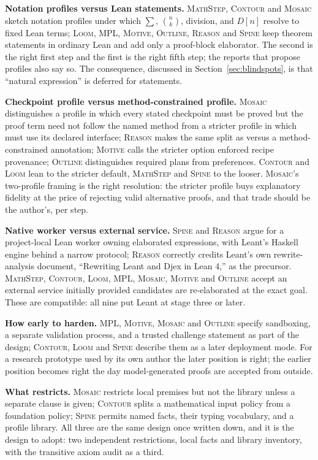 \documentclass[11pt,a4paper]{article}
\newcommand{\code}[1]{\texttt{\detokenize{#1}}}
\newcommand{\MS}{\textsc{MathStep}}
\newcommand{\Co}{\textsc{Contour}}
\newcommand{\Lo}{\textsc{Loom}}
\newcommand{\ML}{\textsc{MPL}}
\newcommand{\Mo}{\textsc{Mosaic}}
\newcommand{\Mv}{\textsc{Motive}}
\newcommand{\Ou}{\textsc{Outline}}
\renewcommand{\Re}{\textsc{Reason}} %
\newcommand{\Sp}{\textsc{Spine}}
\theoremstyle{definition}
\begin{document}
\textbf{Notation profiles versus Lean statements.} \MS, \Co{} and \Mo{} sketch notation profiles under which $\sum$, $\binom{n}{k}$, division, and $D[n]$ resolve to fixed Lean terms; \Lo, \ML, \Mv, \Ou, \Re{} and \Sp{} keep theorem statements in ordinary Lean and add only a proof-block elaborator. The second is the right first step and the first is the right fifth step; the reports that propose profiles also say so. The consequence, discussed in Section~\ref{sec:blindspots}, is that ``natural expression'' is deferred for statements.

\textbf{Checkpoint profile versus method-constrained profile.} \Mo{} distinguishes a profile in which every stated checkpoint must be proved but the proof term need not follow the named method from a stricter profile in which \code{integrate} must use its declared interface; \Re{} makes the same split as \code{by auto} versus a method-constrained annotation; \Mv{} calls the stricter option enforced recipe provenance; \Ou{} distinguishes required plans from preferences. \Co{} and \Lo{} lean to the stricter default, \MS{} and \Sp{} to the looser. \Mo's two-profile framing is the right resolution: the stricter profile buys explanatory fidelity at the price of rejecting valid alternative proofs, and that trade should be the author's, per step.

\textbf{Native worker versus external service.} \Sp{} and \Re{} argue for a project-local Lean worker owning elaborated expressions, with Leant's Haskell engine behind a narrow protocol; \Re{} correctly credits Leant's own rewrite-analysis document, ``Rewriting Leant and Djex in Lean 4,'' as the precursor. \MS, \Co, \Lo, \ML, \Mo, \Mv{} and \Ou{} accept an external service initially provided candidates are re-elaborated at the exact goal. These are compatible: all nine put Leant at stage three or later.

\textbf{How early to harden.} \ML, \Mv, \Mo{} and \Ou{} specify sandboxing, a separate validation process, and a trusted challenge statement as part of the design; \Co, \Lo{} and \Sp{} describe them as a later deployment mode. For a research prototype used by its own author the later position is right; the earlier position becomes right the day model-generated proofs are accepted from outside.

\textbf{What \code{using only} restricts.} \Mo{} restricts local premises but not the library unless a separate \code{library only} clause is given; \Co{} splits a mathematical input policy from a foundation policy; \Sp{} permits named facts, their typing vocabulary, and a profile library. All three are the same design once written down, and it is the design to adopt: two independent restrictions, local facts and library inventory, with the transitive axiom audit as a third.
\end{document}
